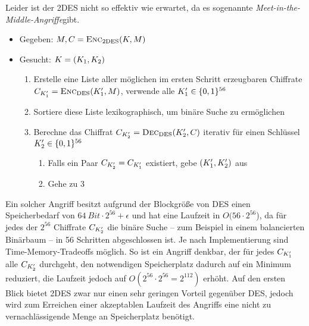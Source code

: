 Leider ist der 2DES nicht so effektiv wie erwartet, da es sogenannte
\emph{Meet-in-the-Middle-Angriffe}\indexMeetInTheMiddle gibt. 
\begin{itemize}
\item Gegeben: $M, C = \textsc{Enc}_{\textnormal{2DES}}(K, M)$
\item Gesucht: $K = (K_{1},K_{2})$
  \begin{enumerate}
  \item Erstelle eine Liste aller möglichen im ersten Schritt
    erzeugbaren Chiffrate $C_{K'_{1}} =
    \textsc{Enc}_{\textnormal{DES}}(K'_{1}, M)$, \dh verwende alle
    $K'_{1} \in \{0,1\}^{56}$ 
  \item Sortiere diese Liste lexikographisch, um binäre Suche zu ermöglichen
  \item Berechne das Chiffrat $C_{K'_{2}} =
    \textsc{Dec}_{\textnormal{DES}}(K'_{2}, C)$ iterativ für einen
    Schlüssel $K'_{2} \in \{0,1\}^{56}$ 
    \begin{enumerate}
    \item Falls ein Paar $C_{K'_2} = C_{K'_{1}}$
      existiert, gebe $(K'_{1},K'_{2})$ aus 
    \item Gehe zu 3
    \end{enumerate}
  \end{enumerate}
\end{itemize}

Ein solcher Angriff besitzt aufgrund der Blockgröße von DES einen
Speicherbedarf von $64\ Bit \cdot 2^{56} + \epsilon$ und hat eine
Laufzeit in $O(56 \cdot 2^{56}$), da für jedes der $2^{56}$ Chiffrate
$C_{K'_2}$ die binäre Suche -- zum Beispiel in einem
balancierten Binärbaum -- in 56 Schritten abgeschlossen ist. Je nach
Implementierung sind Time-Memory-Tradeoffs möglich. So ist ein Angriff
denkbar, der für jedes $C_{K'_1}$ alle $C_{K'_2}$
durchgeht, den notwendigen Speicherplatz dadurch auf ein Minimum
reduziert, die Laufzeit jedoch auf $O(2^{56} \cdot 2^{56} = 2^{112})$
erhöht. Auf den ersten Blick bietet 2DES zwar nur einen sehr geringen
Vorteil gegenüber DES, jedoch wird zum Erreichen einer akzeptablen
Laufzeit des Angriffs eine nicht zu vernachlässigende Menge an
Speicherplatz benötigt.

